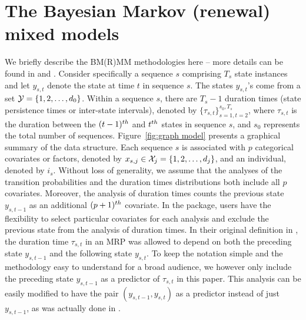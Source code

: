  




 



\vspace*{-6pt}
\section{The Bayesian Markov (renewal) mixed models} \label{sec:models}
\vspace*{-4pt}
We briefly describe the BM(R)MM methodologies here -- more details can be found in \citet{sarkar2018bayesian} and \citet{wu2021bayesian}. 
Consider specifically a sequence $s$ comprising $T_s$ state instances and let $y_{s,t}$ denote the state at time $t$ in sequence $s$. 
The states $y_{s,t}$'s come from a set ${\cal Y} = \{1,2,\dots,d_0\}$.
Within a sequence $s$, there are $T_s-1$ {duration times (state persistence times or inter-state intervals)}, 
denoted by $\{\tau_{s,t}\}_{s=1,t=2}^{s_0,T_s}$, where $\tau_{s,t}$ is the {duration} between the $(t-1)^{th}$ and $t^{th}$ states in sequence $s$, and $s_0$ represents the total number of sequences.
Figure~\ref{fig:graph model} presents a graphical summary of the data structure. 
Each sequence $s$ is associated with $p$ categorical covariates or factors, denoted by $x_{s,j} \in {\cal X}_j = \{1,2,\dots,d_j\}$, and an individual, denoted by $i_{s}$. 
Without loss of generality, we assume that the analyses of the transition probabilities and the {duration times} distributions both include all $p$ covariates. 
Moreover, the analysis of {duration times} counts the previous state $y_{s,t-1}$ as an additional $(p+1)^{th}$ covariate. 
In the  package, users have the flexibility to select particular covariates for each analysis and exclude the previous state from the analysis of duration times.  
In their original definition in \cite{pyke1961markov}, the duration time $\tau_{s,t}$ in an MRP was allowed to depend on both the preceding state $y_{s,t-1}$ and the following state $y_{s,t}$.
To keep the notation simple and the methodology easy to understand for a broad audience, we however only include the preceding state $y_{s,t-1}$ as a predictor of $\tau_{s,t}$ in this paper.
This analysis can be easily modified to  have the pair $(y_{s,t-1}, y_{s,t})$ as a predictor instead of just $y_{s,t-1}$, as was actually done in \cite{wu2021bayesian}.


